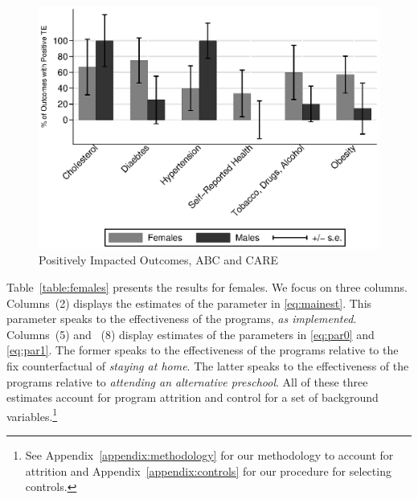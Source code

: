\begin{figure}[H]
		\caption{Positively Impacted Outcomes, ABC and CARE} \label{fig:ppositivecategory2}
		\includegraphics[width=.9\columnwidth]{output/itt_noctrl_cats2.eps}
\end{figure}

\noindent Table~\ref{table:females} presents the results for females. We focus on three columns. Columns~(2) displays the estimates of the parameter in \eqref{eq:mainest}. This parameter speaks to the effectiveness of the programs, \textit{as implemented}. Columns~(5) and ~(8) display estimates of the parameters in \eqref{eq:par0} and \eqref{eq:par1}. The former speaks to the effectiveness of the programs relative to the fix counterfactual of \textit{staying at home}. The latter speaks to the effectiveness of the programs relative to \textit{attending an alternative preschool}. All of these three estimates account for program attrition and control for a set of background variables.\footnote{See Appendix~\ref{appendix:methodology} for our methodology to account for attrition and Appendix~\ref{appendix:controls} for our procedure for selecting controls.}\\ 

